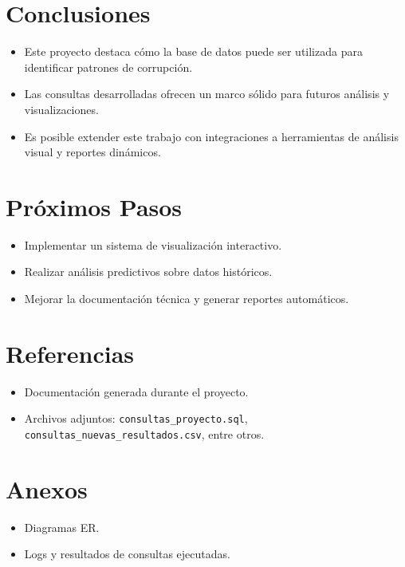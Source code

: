 \documentclass[a4paper, 12pt]{article}
\begin{document}
\section*{Conclusiones}
\begin{itemize}
    \item Este proyecto destaca cómo la base de datos puede ser utilizada para identificar patrones de corrupción.
    \item Las consultas desarrolladas ofrecen un marco sólido para futuros análisis y visualizaciones.
    \item Es posible extender este trabajo con integraciones a herramientas de análisis visual y reportes dinámicos.
\end{itemize}

\section*{Próximos Pasos}
\begin{itemize}
    \item Implementar un sistema de visualización interactivo.
    \item Realizar análisis predictivos sobre datos históricos.
    \item Mejorar la documentación técnica y generar reportes automáticos.
\end{itemize}

\section*{Referencias}
\begin{itemize}
    \item Documentación generada durante el proyecto.
    \item Archivos adjuntos: \texttt{consultas\_proyecto.sql}, \texttt{consultas\_nuevas\_resultados.csv}, entre otros.
\end{itemize}


\section*{Anexos}
\begin{itemize}
    \item Diagramas ER.
    \item Logs y resultados de consultas ejecutadas.
\end{itemize}
\end{document}
